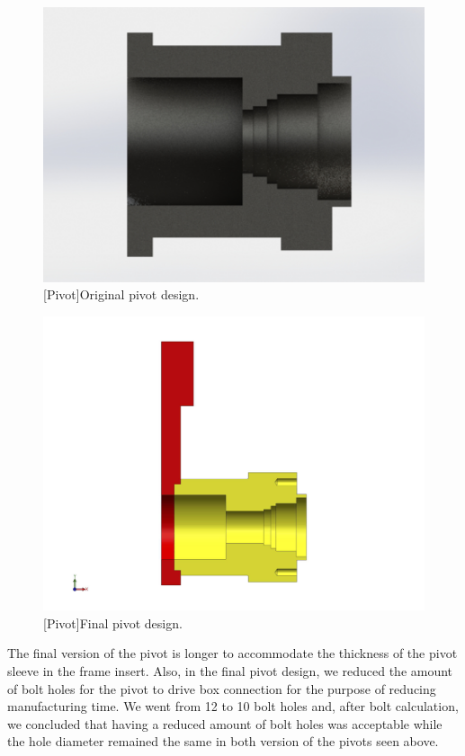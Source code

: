 \begin{figure}[htbp]
\centering
\includegraphics[height=0.3\textheight]{./images/oldpivothaft}
[Pivot]{Original pivot design.}
\label{fig:pivotold}
\end{figure}
\newpage
\begin{figure}[htbp]
\centering
\includegraphics[height=0.3\textheight]{./images/finalpivot}
[Pivot]{Final pivot design.}
\label{fig:pivotfinal}
\end{figure}

The final version of the pivot is longer to accommodate the thickness of the pivot sleeve in the frame insert.  Also, in the final pivot design, we reduced the amount of bolt holes for the pivot to drive box connection for the purpose of reducing manufacturing time. We went from 12 to 10 bolt holes and, after bolt calculation, we concluded that having a reduced amount of bolt holes was acceptable while the hole diameter remained the same in both version of the pivots seen above.

